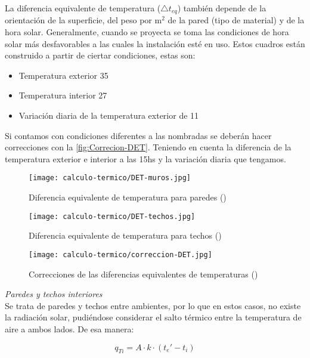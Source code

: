 La diferencia equivalente de temperatura ($\triangle t_{eq}$) tambi\'en depende de la orientaci\'on de la superficie, del peso por m$^2$ de la pared (tipo de material) y de la hora solar. 
Generalmente, cuando se proyecta se toma las condiciones de hora solar m\'as desfavorables a las cuales la instalaci\'on est\'e en uso.
Estos cuadros \parencite{carrier2009} est\'an construido a partir de ciertar condiciones, estas son:
\begin{itemize}
	\item Temperatura exterior 35 \textcelsius
	\item Temperatura interior 27 \textcelsius
	\item Variaci\'on diaria de la temperatura exterior de 11 \textcelsius
\end{itemize}
Si contamos con condiciones diferentes a las nombradas se deber\'an hacer correcciones con la \autoref{fig:Correcion-DET}. Teniendo en cuenta la diferencia de la temperatura exterior e interior a las 15hs y la variaci\'on diaria que tengamos.
\begin{figure}[H]
	\centering
	\caption{Diferencia equivalente de temperatura para paredes (\textcelsius)}
	\label{fig:DET-muros}
	\texttt{[image: calculo-termico/DET-muros.jpg]}
\end{figure}
\begin{figure}[H]
	\centering
	\caption{Diferencia equivalente de temperatura para techos (\textcelsius)}
	\label{fig:DET-techos}
	\texttt{[image: calculo-termico/DET-techos.jpg]}
\end{figure}
\begin{figure}[H]
	\centering
	\caption{Correcciones de las diferencias equivalentes de temperaturas (\textcelsius)}
	\label{fig:Correcion-DET}
	\texttt{[image: calculo-termico/correccion-DET.jpg]}
\end{figure}

\emph{Paredes y techos interiores}\\
Se trata de paredes y techos entre ambientes, por lo que en estos casos, no existe la radiación solar, pudiéndose considerar el salto térmico entre la temperatura de aire a ambos lados. De esa manera:

\begin{equation}\label{eq:transmision-interna}
	q_{Ti} = A \cdot k \cdot (t_e' - t_i)
\end{equation}

